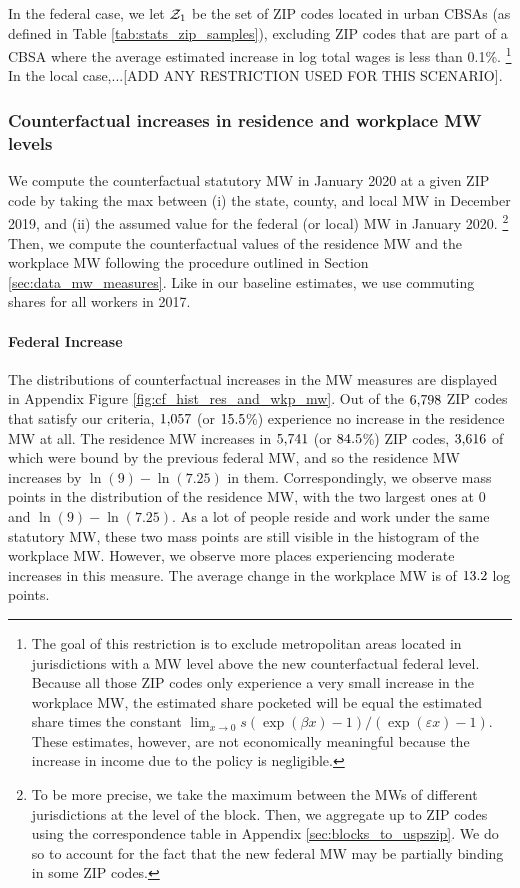 In the federal case, we let $\mathcal{Z}_1$ be the set of ZIP codes located in urban CBSAs (as defined in
Table \ref{tab:stats_zip_samples}), excluding ZIP codes that are part of a CBSA 
where the average estimated increase in log total wages is less than 0.1\%.%
\footnote{\label{foot:restriction_on_zipcodes}
The goal of this restriction is to exclude metropolitan areas located 
in jurisdictions with a MW level above the new counterfactual federal level.
Because all those ZIP codes only experience a very small increase in the 
workplace MW, the estimated share pocketed will be equal the estimated
share times the constant 
$\lim_{x\to 0} s \left(\exp(\beta x)-1\right)/\left(\exp(\varepsilon x)-1\right)$.
These estimates, however, are not economically meaningful because the increase
in income due to the policy is negligible.}
In the local case,...[ADD ANY RESTRICTION USED FOR THIS SCENARIO].

\subsubsection*{Counterfactual increases in residence and workplace MW levels}
\label{sec:cf_res_and_wkp_changes}

We compute the counterfactual statutory MW in January 2020 at a given ZIP code 
by taking the max between (i) the state, county, and local MW in December 2019, 
and (ii) the assumed value for the federal (or local) MW in January 2020.%
\footnote{To be more precise, we take the maximum between the MWs of different
jurisdictions at the level of the block.
Then, we aggregate up to ZIP codes using the correspondence table in Appendix 
\ref{sec:blocks_to_uspszip}.
We do so to account for the fact that the new federal MW may be partially 
binding in some ZIP codes.}
Then, we compute the counterfactual values of the residence MW and the workplace
MW following the procedure outlined in Section \ref{sec:data_mw_measures}.
Like in our baseline estimates, we use commuting shares for all workers in
2017.

\paragraph{Federal Increase}
The distributions of counterfactual increases in the MW measures are displayed 
in Appendix Figure \ref{fig:cf_hist_res_and_wkp_mw}.
Out of the $\textnormal{6,798}$ ZIP codes that satisfy our criteria, 
$\textnormal{1,057}$ (or $\textnormal{15.5}$\%) experience no increase in 
the residence MW at all.
The residence MW increases in $\textnormal{5,741}$ (or $\textnormal{84.5}$\%) ZIP 
codes, $\textnormal{3,616}$ of which were bound by the previous federal MW, and 
so the residence MW increases by $\ln(9)-\ln(7.25)$ in them.
Correspondingly, we observe mass points in the distribution of the residence MW,
with the two largest ones at $0$ and $\ln(9)-\ln(7.25)$.
As a lot of people reside and work under the same statutory MW, these two mass
points are still visible in the histogram of the workplace MW.
However, we observe more places experiencing moderate increases in this measure.
The average change in the workplace MW is of $\textnormal{13.2}$ log points.

